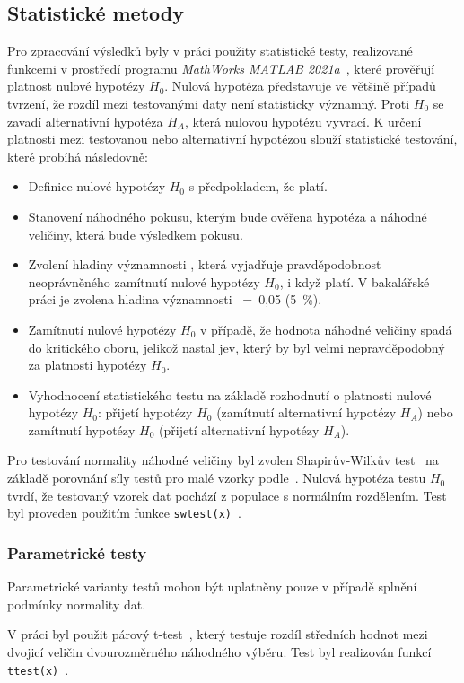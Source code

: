 \subsection{Statistické metody}
\label{section:statistical_methods}
Pro zpracování výsledků byly v práci použity statistické testy, realizované
funkcemi v prostředí programu \textit{MathWorks MATLAB 2021a}~\cite{MATLAB},
které prověřují platnost nulové hypotézy $H_0$. Nulová hypotéza představuje ve
většině případů tvrzení, že rozdíl mezi testovanými daty není statisticky
významný. Proti $H_0$ se zavadí alternativní hypotéza $H_A$, která nulovou
hypotézu vyvrací. K určení platnosti mezi testovanou nebo alternativní hypotézou
slouží statistické testování, které probíhá následovně:
\begin{itemize}
    \item Definice nulové hypotézy $H_0$ s předpokladem, že platí.
    \item Stanovení náhodného pokusu, kterým bude ověřena hypotéza a náhodné
          veličiny, která bude výsledkem pokusu.
    \item Zvolení hladiny významnosti \textalpha, která vyjadřuje
          pravděpodobnost neoprávněného zamítnutí nulové hypotézy $H_0$, i když platí.
          V bakalářské práci je zvolena hladina významnosti \textalpha~=~0,05 (5~\%).
    \item Zamítnutí nulové hypotézy $H_0$ v případě, že hodnota náhodné veličiny
          spadá do kritického oboru, jelikož nastal jev, který by byl velmi
          nepravděpodobný za platnosti hypotézy $H_0$.
    \item Vyhodnocení statistického testu na základě rozhodnutí o platnosti
          nulové hypotézy $H_0$: přijetí hypotézy $H_0$ (zamítnutí alternativní
          hypotézy $H_A$) nebo zamítnutí hypotézy $H_0$ (přijetí alternativní
          hypotézy $H_A$).
\end{itemize}

Pro testování normality náhodné veličiny byl zvolen Shapirův-Wilkův
test~\cite{wikiSHAPIROWILK} na základě porovnání síly testů pro malé vzorky
podle~\cite{Razali2011}. Nulová hypotéza testu $H_0$ tvrdí, že testovaný vzorek
dat pochází z populace s normálním rozdělením. Test byl proveden použitím funkce
\texttt{swtest(x)}~\cite{matlabSWTEST}.

\subsubsection{Parametrické testy}
\label{section:parametric_tests}
Parametrické varianty testů mohou být uplatněny pouze v případě splnění
podmínky normality dat.

V práci byl použit párový t-test~\cite{Henry2005}, který testuje rozdíl
středních hodnot mezi dvojicí veličin dvourozměrného náhodného výběru. Test byl
realizován funkcí \texttt{ttest(x)}~\cite{matlabTTEST}.